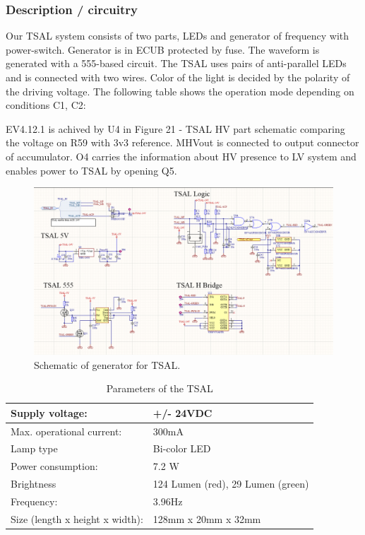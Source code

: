 \subsubsection{Description / circuitry}

Our TSAL system consists of two parts, LEDs and generator of frequency with power-switch. Generator is in ECUB protected by fuse. The waveform is generated with a 555-based circuit. The TSAL uses pairs of anti-parallel LEDs and is connected with two wires. Color of the light is decided by the polarity of the driving voltage. The following table shows the operation mode depending on conditions C1, C2:


EV4.12.1 is achived by U4 in Figure 21 - TSAL HV part schematic comparing the voltage on R59 with 3v3 reference. MHVout is connected to output connector of accumulator. O4 carries the information about HV presence to LV system and enables power to TSAL by opening Q5.

\begin{figure}[H]
	\centering
	\includegraphics[width=\textwidth]{./img/TSAL-ECUB-schematic.png}
	\caption{Schematic of generator for TSAL.}
	\label{fig:TSAL-ECUB-schematic}
\end{figure}

\begin{table}[H]
	\centering
	\caption{Parameters of the TSAL}
	\begin{tabularx}{\textwidth}{|X|X|}
		\hline
		Supply voltage: & +/- 24VDC \\[\TableSize]
		\hline
		Max. operational current: & 300mA \\[\TableSize]
		\hline
		Lamp type & Bi-color LED \\[\TableSize]
		\hline
		Power consumption: & 7.2 W \\[\TableSize]
		\hline
		Brightness & 124 Lumen (red), 29 Lumen (green) \\[\TableSize]
		\hline
		Frequency: & 3.96Hz \\[\TableSize]
		\hline
		Size (length x height x width): & 128mm x 20mm x 32mm \\[\TableSize]
		\hline
	\end{tabularx}%
	\label{tab:TSAL}%
\end{table}%

